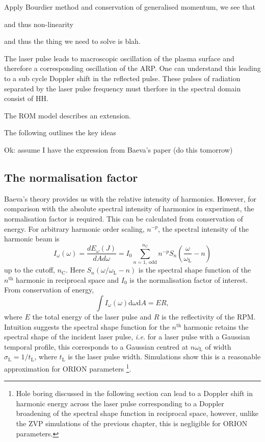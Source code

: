 Apply Bourdier method and conservation of generalised momentum, we see that 

and thus non-linearity

and thus the thing we need to solve is blah.


The laser pulse leads to macroscopic oscillation of the plasma surface and therefore a corresponding oscillation of the ARP. One can understand this leading to a sub cycle Doppler shift in the reflected pulse. These pulses of radiation separated by the laser pulse frequency must therfore in the spectral domain consist of HH.

The \ac{ROM} model describes an extension. 

The following outlines the key ideas 

Ok: assume I have the expression from Baeva's paper (do this tomorrow)

\subsection{The normalisation factor}
Baeva's theory provides us with the relative intensity of harmonics. However, for comparison with the absolute spectral intensity of harmonics in experiment, the normalisation factor is required. This can be calculated from conservation of energy. For arbitrary harmonic order scaling, $n^{-p}$, the spectral intensity of the harmonic beam is
\begin{equation}
	I_\omega(\omega) = \frac{dE_\omega(J)}{dAd\omega} = I_0 \sum^{n_\mathrm{C}}_{n = 1,\ \mathrm{odd}} n^{-p} S_n\left( \frac{\omega}{\omega_\mathrm{L}}-n\right)
\end{equation}
up to the cutoff, $n_\mathrm{C}$. Here $S_n(\omega/\omega_\mathrm{L}-n)$ is the spectral shape function of the $n^\mathrm{th}$ harmonic in reciprocal space and $I_0$ is the normalisation factor of interest. From conservation of energy,
\begin{equation}
	\int I_\omega(\omega) \mathrm{d}\omega \mathrm{d} A = ER,
\end{equation}
where $E$ the total energy of the laser pulse and $R$ is the reflectivity of the \ac{RPM}. Intuition suggests the spectral shape function for the $n^\mathrm{th}$ harmonic retains the spectral shape of the incident laser pulse, \textit{i.e.} for a laser pulse with a Gaussian temporal profile, this corresponds to a Gaussian centred at $n\omega_\mathrm{L}$ of width $\sigma_\mathrm{L} = 1/t_\mathrm{L}$, where $t_\mathrm{L}$ is the laser pulse width. Simulations show this is a reasonable approximation for ORION parameters \footnote{Hole boring discussed in the following section can lead to a Doppler shift in harmonic energy across the laser pulse corresponding to a Doppler broadening of the spectral shape function in reciprocal space, however, unlike the ZVP simulations of the previous chapter, this is negligible for ORION parameters.}.

